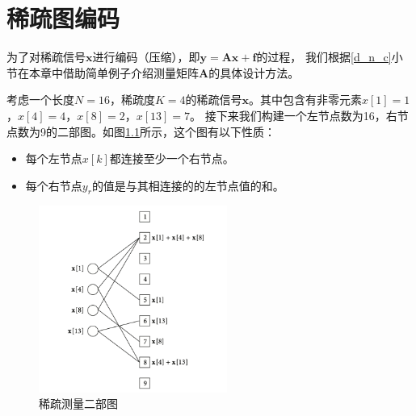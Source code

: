 \documentclass[AutoFakeBold]{LZUThesis}
\begin{document}
\chapter{稀疏图编码}
\label{2}

为了对稀疏信号$\mathbf{x}$进行编码（压缩），即$\mathbf{y} = \mathbf{Ax} + \mathbf{f}$的过程，
我们根据\ref{d_n_c}小节在本章中借助简单例子介绍测量矩阵$\mathbf{A}$的具体设计方法。

考虑一个长度$N=16$，稀疏度$K=4$的稀疏信号$\mathbf{x}$。其中包含有非零元素$x[1] = 1$，$x[4] = 4$，$x[8] = 2$，$x[13] = 7$。
接下来我们构建一个左节点数为16，右节点数为9的二部图。如图\ref{fig_bip_graph}所示，这个图有以下性质：

\begin{itemize}
    \item 每个左节点$x[k]$都连接至少一个右节点。
    \item 每个右节点$y_r$的值是与其相连接的的左节点值的和。
\end{itemize}

\begin{figure}[H]
    \centering
    \includegraphics[width=0.55\textwidth]{figures/bip_g.png}
    \caption{稀疏测量二部图}
    \label{fig_bip_graph}
\end{figure}
\end{document}
